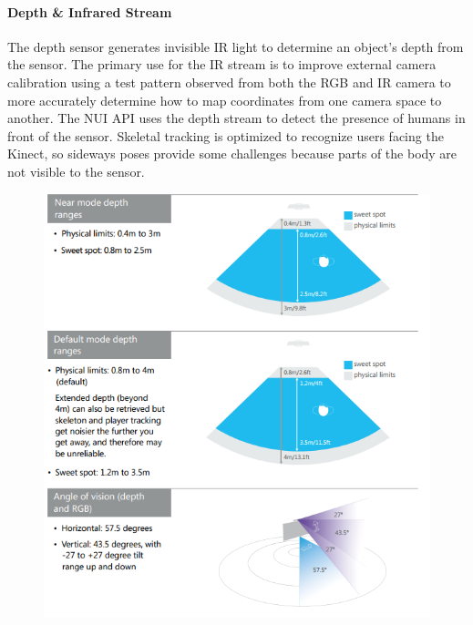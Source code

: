 \paragraph{Depth \& Infrared Stream}
The depth sensor generates invisible IR light to determine an object's depth from the sensor. The primary use for the IR stream is to improve external camera calibration using a test pattern observed from both the RGB and IR camera to more accurately determine how to map coordinates from one camera space to another. \cite{irstream} The NUI API uses the depth stream to detect the presence of humans in front of the sensor.\cite{winSDK} Skeletal tracking is optimized to recognize users facing the Kinect, so sideways poses provide some challenges because parts of the body are not visible to the sensor.

\begin{figure}[h]
    \centering
    \includegraphics[height=0.45\textheight]{fig02/kinDepth}
    \label{fig:kinsdepth}
\end{figure}


